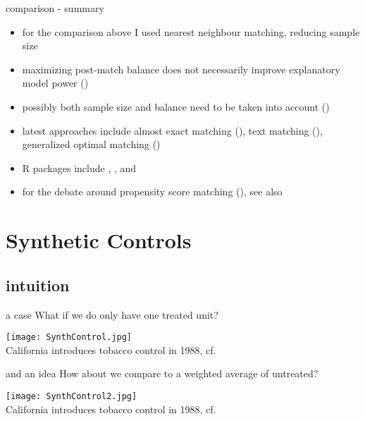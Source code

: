 \documentclass[aspectratio=169]{beamer}
\begin{document}
		\begin{frame}{comparison - summary}
			\begin{itemize}
				\item<1-> for the comparison above I used nearest neighbour matching, reducing sample size
				\item<2-> maximizing post-match balance does not necessarily improve explanatory model power (\cite{Colson2016})
				\item<3-> possibly both sample size and balance need to be taken into account (\cite{King2017})
				\item<4-> latest approaches include almost exact matching (\cite{Dieng2018,Dieng2021}), text matching (\cite{Roberts2020a}), generalized optimal matching (\cite{Kallus2020})
				\item<5-> R packages include \href{https://cran.r-project.org/web/packages/MatchIt/vignettes/MatchIt.html}{\underline{}}, \href{http://sekhon.berkeley.edu/matching/}{\underline{}}, and \href{https://github.com/insongkim/PanelMatch}{\underline{}}
				\item<6> for the debate around propensity score matching (\cite{King2019}), see also \href{https://p-hunermund.com/2019/02/06/why-so-much-hate-against-propensity-score-matching/amp/)}{\underline{}}
			\end{itemize}
		\end{frame}

\section{Synthetic Controls}

	\subsection{intuition}

		\begin{frame}{a case}
			What if we do only have one treated unit?
			\begin{center}
				\texttt{[image: SynthControl.jpg]}
				\\\tiny{California introduces tobacco control in 1988, cf. \cite{Abadie2010}}
			\end{center}
		\end{frame}

		\begin{frame}{and an idea}
			How about we compare to a weighted average of untreated?
			\begin{center}
				\texttt{[image: SynthControl2.jpg]}
				\\\tiny{California introduces tobacco control in 1988, cf. \cite{Abadie2010}}
			\end{center}
		\end{frame}
\end{document}

